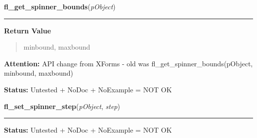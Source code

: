     \vspace{0.5ex}

\hspace{.8\funcindent}\begin{boxedminipage}{\funcwidth}

    \raggedright \textbf{fl\_get\_spinner\_bounds}(\textit{pObject})

    \vspace{-1.5ex}

    \rule{\textwidth}{0.5\fboxrule}
\setlength{\parskip}{2ex}
\setlength{\parskip}{1ex}
      \textbf{Return Value}
    \vspace{-1ex}

      \begin{quote}
      minbound, maxbound

      \end{quote}

\textbf{Attention:} API change from XForms - old was fl\_get\_spinner\_bounds(pObject, 
minbound, maxbound)



\textbf{Status:} Untested + NoDoc + NoExample = NOT OK



    \end{boxedminipage}

    \label{xformslib:library:fl_set_spinner_step}

    \vspace{0.5ex}

\hspace{.8\funcindent}\begin{boxedminipage}{\funcwidth}

    \raggedright \textbf{fl\_set\_spinner\_step}(\textit{pObject}, \textit{step})

    \vspace{-1.5ex}

    \rule{\textwidth}{0.5\fboxrule}
\setlength{\parskip}{2ex}
\setlength{\parskip}{1ex}
\textbf{Status:} Untested + NoDoc + NoExample = NOT OK



    \end{boxedminipage}

    \label{xformslib:library:fl_get_spinner_step}

